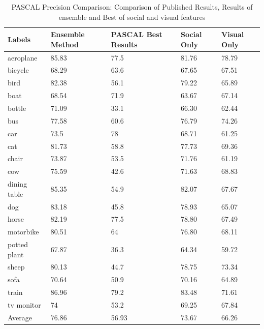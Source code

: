 \begin{table}
\centering
\caption{ PASCAL Precision Comparison: Comparison of Published Results, Results of ensemble and Best of social and visual features} %
\vspace*{0.2 cm}
\begin{tabular}{| p{1.7cm}| p{1.5cm}|p{1.2cm}|p{1.2cm}|p{1.2cm}|} \hline
 Labels & Ensemble Method & PASCAL Best Results & Social Only & Visual Only  \\  [1ex] \hline
aeroplane & 85.83 & 77.5 & 81.76 & 78.79 \\  [1ex] \hline
bicycle & 68.29 & 63.6 & 67.65 & 67.51 \\  [1ex] \hline
bird & 82.38 & 56.1 & 79.22 & 65.89 \\  [1ex] \hline
boat & 68.54 & 71.9 & 63.67 & 67.14 \\  [1ex] \hline
bottle & 71.09 & 33.1 & 66.30 & 62.44 \\  [1ex] \hline
bus & 77.58 & 60.6 & 76.79 & 74.26 \\  [1ex] \hline
car & 73.5 & 78 & 68.71 & 61.25 \\  [1ex] \hline
cat & 81.73 & 58.8 & 77.73 & 69.36 \\  [1ex] \hline
chair & 73.87 & 53.5 & 71.76 & 61.19 \\  [1ex] \hline
cow & 75.59 & 42.6 & 71.63 & 68.83 \\  [1ex] \hline
dining table & 85.35 & 54.9 & 82.07 & 67.67 \\  [1ex] \hline
dog & 83.18 & 45.8 & 78.93 & 65.07 \\  [1ex] \hline
horse & 82.19 & 77.5 & 78.80 & 67.49 \\  [1ex] \hline
motorbike & 80.51 & 64 & 76.80 & 68.11 \\  [1ex] \hline
potted plant & 67.87 & 36.3 & 64.34 & 59.72 \\  [1ex] \hline
sheep & 80.13 & 44.7 & 78.75 & 73.34 \\  [1ex] \hline
sofa & 70.64 & 50.9 & 70.16 & 64.89 \\  [1ex] \hline
train & 86.96 & 79.2 & 83.48 & 71.61 \\  [1ex] \hline
tv monitor & 74 & 53.2 & 69.25 & 67.84 \\  [1ex] \hline
Average & 76.86 & 56.93 & 73.67 & 66.26 \\  [1ex] \hline
\end{tabular}
 \label{PASCALPrecisionOverAll} %
\end{table}

